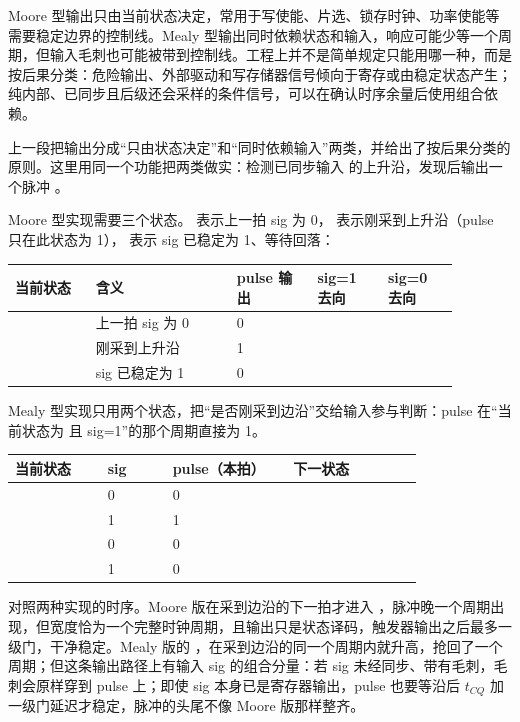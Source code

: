 Moore 型输出只由当前状态决定，常用于写使能、片选、锁存时钟、功率使能等需要稳定边界的控制线。Mealy 型输出同时依赖状态和输入，响应可能少等一个周期，但输入毛刺也可能被带到控制线。工程上并不是简单规定只能用哪一种，而是按后果分类：危险输出、外部驱动和写存储器信号倾向于寄存或由稳定状态产生；纯内部、已同步且后级还会采样的条件信号，可以在确认时序余量后使用组合依赖。


上一段把输出分成“只由状态决定”和“同时依赖输入”两类，并给出了按后果分类的原则。这里用同一个功能把两类做实：检测已同步输入  的上升沿，发现后输出一个脉冲 。

Moore 型实现需要三个状态。 表示上一拍 sig 为 0， 表示刚采到上升沿（pulse 只在此状态为 1）， 表示 sig 已稳定为 1、等待回落：

\begin{longtable}{L{0.16\linewidth}L{0.28\linewidth}L{0.16\linewidth}L{0.14\linewidth}L{0.14\linewidth}}
\toprule
当前状态 & 含义 & pulse 输出 & sig=1 去向 & sig=0 去向 \\
\midrule
{} & 上一拍 sig 为 0 & 0 &  &  \\
 & 刚采到上升沿 & 1 &  &  \\
 & sig 已稳定为 1 & 0 &  &  \\
\bottomrule
\end{longtable}

Mealy 型实现只用两个状态，把“是否刚采到边沿”交给输入参与判断：pulse 在“当前状态为  且 sig=1”的那个周期直接为 1。

\begin{longtable}{L{0.20\linewidth}L{0.14\linewidth}L{0.26\linewidth}L{0.28\linewidth}}
\toprule
当前状态 & sig & pulse（本拍） & 下一状态 \\
\midrule
{} & 0 & 0 &  \\
 & 1 & 1 &  \\
 & 0 & 0 &  \\
 & 1 & 0 &  \\
\bottomrule
\end{longtable}

对照两种实现的时序。Moore 版在采到边沿的下一拍才进入 ，脉冲晚一个周期出现，但宽度恰为一个完整时钟周期，且输出只是状态译码，触发器输出之后最多一级门，干净稳定。Mealy 版的 ，在采到边沿的同一个周期内就升高，抢回了一个周期；但这条输出路径上有输入 sig 的组合分量：若 sig 未经同步、带有毛刺，毛刺会原样穿到 pulse 上；即使 sig 本身已是寄存器输出，pulse 也要等沿后 $t_{CQ}$ 加一级门延迟才稳定，脉冲的头尾不像 Moore 版那样整齐。

